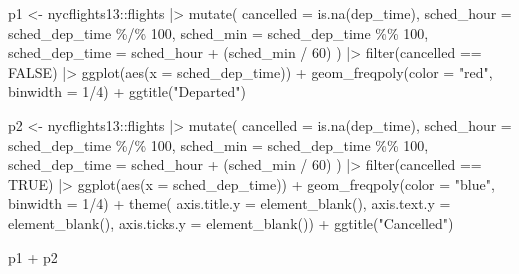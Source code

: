 \documentclass[
  letterpaper,
  DIV=11,
  numbers=noendperiod]{scrreprt}
\newenvironment{Shaded}{\begin{snugshade}}{\end{snugshade}}
\newcommand{\AttributeTok}[1]{\textcolor[rgb]{0.40,0.45,0.13}{#1}}
\newcommand{\ConstantTok}[1]{\textcolor[rgb]{0.56,0.35,0.01}{#1}}
\newcommand{\DecValTok}[1]{\textcolor[rgb]{0.68,0.00,0.00}{#1}}
\newcommand{\FunctionTok}[1]{\textcolor[rgb]{0.28,0.35,0.67}{#1}}
\newcommand{\NormalTok}[1]{\textcolor[rgb]{0.00,0.23,0.31}{#1}}
\newcommand{\OtherTok}[1]{\textcolor[rgb]{0.00,0.23,0.31}{#1}}
\newcommand{\SpecialCharTok}[1]{\textcolor[rgb]{0.37,0.37,0.37}{#1}}
\newcommand{\StringTok}[1]{\textcolor[rgb]{0.13,0.47,0.30}{#1}}
\begin{document}
\begin{Shaded}
\begin{Highlighting}[]
\NormalTok{p1 }\OtherTok{\textless{}{-}}\NormalTok{ nycflights13}\SpecialCharTok{::}\NormalTok{flights }\SpecialCharTok{|\textgreater{}} 
  \FunctionTok{mutate}\NormalTok{(}
    \AttributeTok{cancelled =} \FunctionTok{is.na}\NormalTok{(dep\_time),}
    \AttributeTok{sched\_hour =}\NormalTok{ sched\_dep\_time }\SpecialCharTok{\%/\%} \DecValTok{100}\NormalTok{,}
    \AttributeTok{sched\_min =}\NormalTok{ sched\_dep\_time }\SpecialCharTok{\%\%} \DecValTok{100}\NormalTok{,}
    \AttributeTok{sched\_dep\_time =}\NormalTok{ sched\_hour }\SpecialCharTok{+}\NormalTok{ (sched\_min }\SpecialCharTok{/} \DecValTok{60}\NormalTok{)}
\NormalTok{  ) }\SpecialCharTok{|\textgreater{}} 
  \FunctionTok{filter}\NormalTok{(cancelled }\SpecialCharTok{==} \ConstantTok{FALSE}\NormalTok{) }\SpecialCharTok{|\textgreater{}}
  \FunctionTok{ggplot}\NormalTok{(}\FunctionTok{aes}\NormalTok{(}\AttributeTok{x =}\NormalTok{ sched\_dep\_time)) }\SpecialCharTok{+} 
  \FunctionTok{geom\_freqpoly}\NormalTok{(}\AttributeTok{color =} \StringTok{"red"}\NormalTok{, }\AttributeTok{binwidth =} \DecValTok{1}\SpecialCharTok{/}\DecValTok{4}\NormalTok{) }\SpecialCharTok{+} 
  \FunctionTok{ggtitle}\NormalTok{(}\StringTok{"Departed"}\NormalTok{)}

\NormalTok{p2 }\OtherTok{\textless{}{-}}\NormalTok{ nycflights13}\SpecialCharTok{::}\NormalTok{flights }\SpecialCharTok{|\textgreater{}} 
  \FunctionTok{mutate}\NormalTok{(}
    \AttributeTok{cancelled =} \FunctionTok{is.na}\NormalTok{(dep\_time),}
    \AttributeTok{sched\_hour =}\NormalTok{ sched\_dep\_time }\SpecialCharTok{\%/\%} \DecValTok{100}\NormalTok{,}
    \AttributeTok{sched\_min =}\NormalTok{ sched\_dep\_time }\SpecialCharTok{\%\%} \DecValTok{100}\NormalTok{,}
    \AttributeTok{sched\_dep\_time =}\NormalTok{ sched\_hour }\SpecialCharTok{+}\NormalTok{ (sched\_min }\SpecialCharTok{/} \DecValTok{60}\NormalTok{)}
\NormalTok{  ) }\SpecialCharTok{|\textgreater{}} 
  \FunctionTok{filter}\NormalTok{(cancelled }\SpecialCharTok{==} \ConstantTok{TRUE}\NormalTok{) }\SpecialCharTok{|\textgreater{}}
  \FunctionTok{ggplot}\NormalTok{(}\FunctionTok{aes}\NormalTok{(}\AttributeTok{x =}\NormalTok{ sched\_dep\_time)) }\SpecialCharTok{+} 
  \FunctionTok{geom\_freqpoly}\NormalTok{(}\AttributeTok{color =} \StringTok{"blue"}\NormalTok{, }\AttributeTok{binwidth =} \DecValTok{1}\SpecialCharTok{/}\DecValTok{4}\NormalTok{) }\SpecialCharTok{+} 
  \FunctionTok{theme}\NormalTok{(}
    \AttributeTok{axis.title.y =} \FunctionTok{element\_blank}\NormalTok{(),}
    \AttributeTok{axis.text.y =} \FunctionTok{element\_blank}\NormalTok{(),}
    \AttributeTok{axis.ticks.y =} \FunctionTok{element\_blank}\NormalTok{()) }\SpecialCharTok{+}
  \FunctionTok{ggtitle}\NormalTok{(}\StringTok{"Cancelled"}\NormalTok{)}
  
\NormalTok{p1 }\SpecialCharTok{+}\NormalTok{ p2}
\end{Highlighting}
\end{Shaded}
\end{document}
